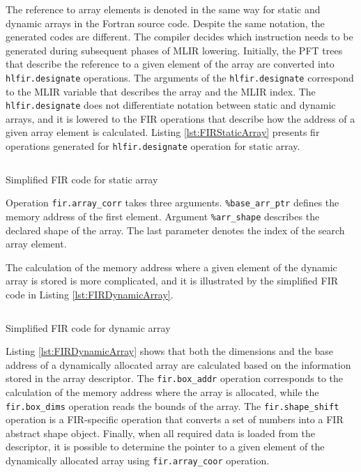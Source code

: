 \documentclass[acmtog,natbib=false]{acmart}
\newcommand{\code}[1]{\texttt{#1}\xspace}
\begin{document}
The reference to array elements is denoted in the same way for static and dynamic arrays in the Fortran source code.
Despite the same notation, the generated codes are different.
The compiler decides which instruction needs to be generated during subsequent phases of \ac{MLIR} lowering.
Initially, the \ac{PFT} trees that describe the reference to a given element of the array are converted into \code{hlfir.designate} operations.
The arguments of the \code{hlfir.designate} correspond to the \ac{MLIR} variable that describes the array and the \ac{MLIR} index.
The \code{hlfir.designate} does not differentiate notation between static and dynamic arrays, and it is lowered to the FIR operations that describe how the address of a given array element is calculated.
Listing \ref{lst:FIRStaticArray} presents fir operations generated for \code{hlfir.designate} operation for static array.


\begin{listing}[t]
\inputminted{MLIR-lexer.py:MlirLexer -x}{code/FIR_static_array.mlir}
\caption{Simplified FIR code for static array}
\label{lst:FIRStaticArray}
\end{listing}

Operation \code{fir.array\_corr} takes three arguments.
\code{\%base\_arr\_ptr} defines the memory address of the first element.
Argument \code{\%arr\_shape} describes the
declared shape of the array.
The last parameter denotes the index of the search array element.

The calculation of the memory address where a given element of the dynamic array is stored is more complicated, and it is illustrated by the simplified FIR code in Listing \ref{lst:FIRDynamicArray}.

\begin{listing}[t]
\inputminted{MLIR-lexer.py:MlirLexer -x}{code/FIR_dynamic_array.mlir}
\caption{Simplified FIR code for dynamic array}
\label{lst:FIRDynamicArray}
\end{listing}

Listing \ref{lst:FIRDynamicArray} shows that both the dimensions and the base address of a dynamically allocated array are calculated based on the information stored in the array descriptor.
The \code{fir.box\_addr} operation corresponds to the calculation of the memory address where the array is allocated, while the \code{fir.box\_dims} operation reads the bounds of the array.
The \code{fir.shape\_shift} operation is a \ac{FIR}-specific operation that converts a set of numbers into a \ac{FIR} abstract shape object.
Finally, when all required data is loaded from the descriptor, it is possible to determine the pointer to a given element of the dynamically allocated array using \code{fir.array\_coor} operation.
\end{document}
